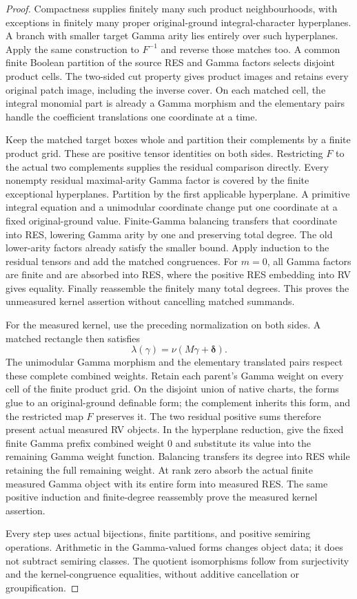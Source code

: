 \begin{proof}
Compactness supplies finitely many such product neighbourhoods, with
exceptions in finitely many proper original-ground integral-character
hyperplanes. A branch with smaller target Gamma arity lies entirely
over such hyperplanes. Apply the same construction to $F^{-1}$ and
reverse those matches too. A common finite Boolean partition of the
source RES and Gamma factors selects disjoint product cells. The
two-sided cut property gives product images and retains every original
patch image, including the inverse cover. On each matched cell, the
integral monomial part is already a Gamma morphism and the elementary
pairs handle the coefficient translations one coordinate at a time.

Keep the matched target boxes whole and partition their complements by
a finite product grid. These are positive tensor identities on both
sides. Restricting $F$ to the actual two complements supplies the
residual comparison directly. Every nonempty residual maximal-arity
Gamma factor is covered by the finite exceptional hyperplanes.
Partition by the first applicable hyperplane. A primitive integral
equation and a unimodular coordinate change put one coordinate at a
fixed original-ground value. Finite-Gamma balancing transfers that
coordinate into RES, lowering Gamma arity by one and preserving total
degree. The old lower-arity factors already satisfy the smaller bound.
Apply induction to the residual tensors and add the matched congruences.
For $m=0$, all Gamma factors are finite and are absorbed into RES, where
the positive RES embedding into RV gives equality. Finally reassemble
the finitely many total degrees. This proves the unmeasured kernel
assertion without cancelling matched summands.

For the measured kernel, use the preceding normalization on both
sides. A matched rectangle then satisfies
\[
 \lambda(\gamma)=\nu(M\gamma+\boldsymbol\delta).
\]
The unimodular Gamma morphism and the elementary translated pairs
respect these complete combined weights. Retain each parent's Gamma
weight on every cell of the finite product grid. On the disjoint union
of native charts, the forms glue to an original-ground definable form;
the complement inherits this form, and the restricted map $F$ preserves
it. The two residual positive sums therefore present actual measured RV
objects. In the hyperplane reduction, give the fixed finite Gamma
prefix combined weight $0$ and substitute its value into the remaining
Gamma weight function. Balancing transfers its degree into RES while
retaining the full remaining weight. At rank zero absorb the actual
finite measured Gamma object with its entire form into measured RES.
The same positive induction and finite-degree reassembly prove the
measured kernel assertion.

Every step uses actual bijections, finite partitions, and positive
semiring operations. Arithmetic in the Gamma-valued forms changes
object data; it does not subtract semiring classes. The quotient
isomorphisms follow from surjectivity and the kernel-congruence
equalities, without additive cancellation or groupification.
\end{proof}
